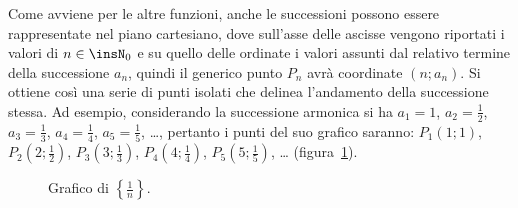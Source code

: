 Come avviene per le altre funzioni, anche le successioni possono essere rappresentate nel piano cartesiano, dove sull'asse delle ascisse vengono riportati i valori di $n\in\insN_0$ e su quello delle ordinate i valori assunti dal relativo termine della successione $a_n$, quindi il generico punto $P_n$ avrà coordinate $(n;a_n)$. Si ottiene così una serie di punti isolati che delinea l'andamento della successione stessa. Ad esempio, considerando la successione armonica si ha $a_1 = 1$, $a_2=\frac{1}{2}$, $a_3=\frac{1}{3}$, $a_4=\frac{1}{4}$, $a_5=\frac{1}{5}$, \ldots, pertanto i punti del suo grafico saranno: $P_1(1;1)$, $P_2\left(2;\frac{1}{2}\right)$, $P_3\left(3;\frac{1}{3}\right)$, $P_4\left(4;\frac{1}{4}\right)$, $P_5\left(5;\frac{1}{5}\right)$, \ldots{} (figura~\ref{fig:8a.1}).

\begin{figure}[hbt]
 \begin{minipage}[t]{\textwidth}
\centering
 
\caption{Grafico di $\left\{\frac{1}{n}\right\}$.}\label{fig:8a.1}
 \end{minipage}\hfil
\end{figure}

